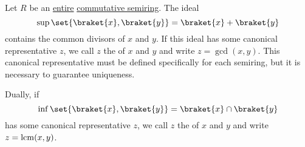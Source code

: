 \begin{definition}\label{def:gcd_and_lcm}\mimprovised
  Let \( R \) be an \hyperref[def:entire_semiring]{entire} \hyperref[def:semiring/commutative]{commutative semiring}. The ideal
  \begin{equation*}
    \sup\set{ \braket{x}, \braket{y} } = \braket{x} + \braket{y}
  \end{equation*}
  contains the common divisors of \( x \) and \( y \). If this ideal has some canonical representative \( z \), we call \( z \) the  of \( x \) and \( y \) and write \( z = \gcd(x, y) \). This canonical representative must be defined specifically for each semiring, but it is necessary to guarantee uniqueness.

  Dually, if
  \begin{equation*}
    \inf\set{ \braket{x}, \braket{y} } = \braket{x} \cap \braket{y}
  \end{equation*}
  has some canonical representative \( z \), we call \( z \) the  of \( x \) and \( y \) and write \( z = \operatorname{lcm}(x, y) \).
\end{definition}

